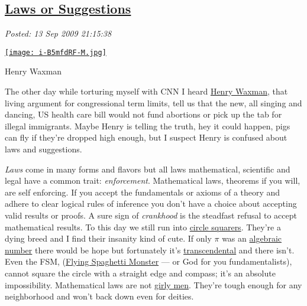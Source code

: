 %

\subsection*{\href{http://bakerjd99.wordpress.com/2009/09/13/laws-or-suggestions/}{Laws or Suggestions}}


\noindent\emph{Posted: 13 Sep 2009 21:15:38}
\vspace{6pt}


\captionsetup[floatingfigure]{labelformat=empty}
\begin{floatingfigure}[l]{0.25\textwidth}
\centering
\href{http://www.toonpool.com/cartoons/Henry\%20A.\%20Waxman\_28470}{\texttt{[image: i-B5mfdRF-M.jpg]}}
\caption{Henry  Waxman}
\label{fig:61X0}
\end{floatingfigure}
The other day while torturing myself with CNN I heard
\href{http://waxman.house.gov/}{Henry Waxman}, that living argument for
congressional term limits, tell us that the new, all singing and
dancing, US health care bill would not fund abortions or pick up the tab
for illegal immigrants. Maybe Henry is telling the truth, hey it could
happen, pigs can fly if they're dropped high enough, but I suspect Henry
is confused about laws and suggestions.

\emph{Laws} come in many forms and flavors but all laws mathematical,
scientific and legal have a common trait: \emph{enforcement}.
Mathematical laws, theorems if you will, are self enforcing. If you
accept the fundamentals or axioms of a theory and adhere to clear
logical rules of inference you don't have a choice about accepting valid
results or proofs. A sure sign of \emph{crankhood} is the steadfast
refusal to accept mathematical results. To this day we still run into
\href{http://en.wikipedia.org/wiki/Squaring\_the\_circle}{circle
squarers}. They're a dying breed and I find their insanity kind of cute.
If only $\pi$ was an
\href{http://mathworld.wolfram.com/AlgebraicNumber.html}{algebraic
number} there would be hope but fortunately it's
\href{http://sprott.physics.wisc.edu/Pickover/trans.html}{transcendental} and
there isn't. Even the FSM, (\href{http://www.venganza.org/}{Flying
Spaghetti Monster} --- or God for you fundamentalists), cannot square
the circle with a straight edge and compass; it's an absolute
impossibility. Mathematical laws are not
\href{http://www.telegraph.co.uk/news/uknews/1559749/Girly-men-are-perfect-partners-say-women.html}{girly
men}. They're tough enough for any neighborhood and won't back down even
for deities.

